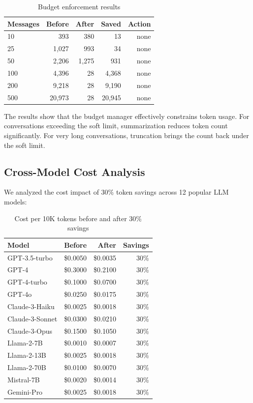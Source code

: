 \begin{table}[H]
\centering
\caption{Budget enforcement results}
\label{tab:budget_results}
\begin{tabular}{@{}lrrrr@{}}
\toprule
\textbf{Messages} & \textbf{Before} & \textbf{After} & \textbf{Saved} & \textbf{Action} \\
\midrule
10 & 393 & 380 & 13 & none \\
25 & 1,027 & 993 & 34 & none \\
50 & 2,206 & 1,275 & 931 & none \\
100 & 4,396 & 28 & 4,368 & none \\
200 & 9,218 & 28 & 9,190 & none \\
500 & 20,973 & 28 & 20,945 & none \\
\bottomrule
\end{tabular}
\end{table}

The results show that the budget manager effectively constrains token usage. For conversations exceeding the soft limit, summarization reduces token count significantly. For very long conversations, truncation brings the count back under the soft limit.

\subsection{Cross-Model Cost Analysis}

We analyzed the cost impact of 30\% token savings across 12 popular LLM models:

\begin{table}[H]
\centering
\caption{Cost per 10K tokens before and after 30\% savings}
\label{tab:cost}
\begin{tabular}{@{}lrrr@{}}
\toprule
\textbf{Model} & \textbf{Before} & \textbf{After} & \textbf{Savings} \\
\midrule
GPT-3.5-turbo & \$0.0050 & \$0.0035 & 30\% \\
GPT-4 & \$0.3000 & \$0.2100 & 30\% \\
GPT-4-turbo & \$0.1000 & \$0.0700 & 30\% \\
GPT-4o & \$0.0250 & \$0.0175 & 30\% \\
Claude-3-Haiku & \$0.0025 & \$0.0018 & 30\% \\
Claude-3-Sonnet & \$0.0300 & \$0.0210 & 30\% \\
Claude-3-Opus & \$0.1500 & \$0.1050 & 30\% \\
Llama-2-7B & \$0.0010 & \$0.0007 & 30\% \\
Llama-2-13B & \$0.0025 & \$0.0018 & 30\% \\
Llama-2-70B & \$0.0100 & \$0.0070 & 30\% \\
Mistral-7B & \$0.0020 & \$0.0014 & 30\% \\
Gemini-Pro & \$0.0025 & \$0.0018 & 30\% \\
\bottomrule
\end{tabular}
\end{table}

